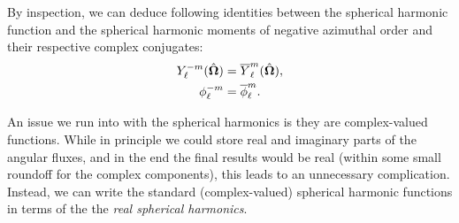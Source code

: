 
By inspection, we can deduce following identities between the spherical harmonic function and the spherical harmonic moments of negative azimuthal order and their respective complex conjugates:
\begin{subequations} \label{Eq:transport_sphericalHarmonicsIdentities_negativeOrders}
\begin{align}
  Y_\ell^{-m}(\hat{\mathbf{\Omega}}) &= \overline{Y}_\ell^m(\hat{\mathbf{\Omega}}), \\
  \phi_\ell^{-m} &= \overline{\phi}_\ell^m .
\end{align}
\end{subequations}

An issue we run into with the spherical harmonics is they are complex-valued functions. While in principle we could store real and imaginary parts of the angular fluxes, and in the end the final results would be real (within some small roundoff for the complex components), this leads to an unnecessary complication. Instead, we can write the standard (complex-valued) spherical harmonic functions in terms of the the \emph{real spherical harmonics}.

